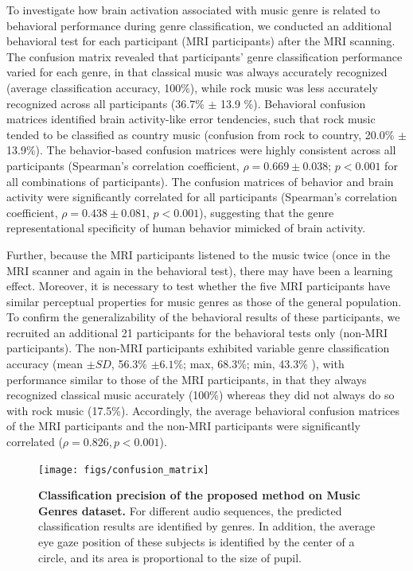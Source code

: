 \documentclass[journal]{IEEEtran}
\begin{document}
To investigate how brain activation associated with music genre is related to behavioral performance during genre classification, we conducted an additional behavioral test for each participant (MRI participants) after the MRI scanning.
The confusion matrix revealed that participants' genre classification performance varied for each genre, in that classical music was always accurately recognized (average classification accuracy, 100\%), while rock music was less accurately recognized across all participants (36.7\% $\pm$ 13.9 \%).
Behavioral confusion matrices identified brain activity-like error tendencies, such that rock music tended to be classified as country music (confusion from rock to country, 20.0\% $\pm$ 13.9\%).
The behavior-based confusion matrices were highly consistent across all participants (Spearman's correlation coefficient, $ \rho = 0.669 \pm 0.038 $; $ p < 0.001 $ for all combinations of participants).
The confusion matrices of behavior and brain activity were significantly correlated for all participants (Spearman's correlation coefficient, $ \rho = 0.438 \pm 0.081 $, $ p < 0.001 $), suggesting that the genre representational specificity of human behavior mimicked of brain activity.


Further, because the MRI participants listened to the music twice (once in the MRI scanner and again in the behavioral test), there may have been a learning effect.
Moreover, it is necessary to test whether the five MRI participants have similar perceptual properties for music genres as those of the general population.
To confirm the generalizability of the behavioral results of these participants, we recruited an additional 21 participants for the behavioral tests only (non-MRI participants).
The non-MRI participants exhibited variable genre classification accuracy (mean $\pm SD $, 56.3\% $ \pm 6.1\% $; max, 68.3\%; min, 43.3\% ), with performance similar to those of the MRI participants, in that they always recognized classical music accurately (100\%) whereas they did not always do so with rock music (17.5\%). 
Accordingly, the average behavioral confusion matrices of the MRI participants and the non-MRI participants were significantly correlated ($ \rho = 0.826, p < 0.001 $).


\begin{figure}[t]
	\centering
	\texttt{[image: figs/confusion\_matrix]}
	\caption{
		\textbf{
			Classification precision of the proposed method on Music Genres dataset. 
		}
		For different audio sequences, the predicted classification results are identified by genres.
		In addition, the average eye gaze position of these subjects is identified by the center of a circle, and its area is proportional to the size of pupil.
	}
	\label{fig:confusion_matrix}
\end{figure}
\end{document}

